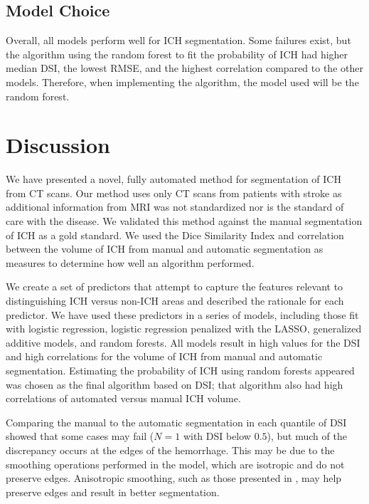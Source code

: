 \documentclass{elsarticle_nonatbib}\usepackage[]{graphicx}\usepackage[]{color}
\begin{document}
\subsection{Model Choice}
Overall, all models perform well for ICH segmentation.  Some failures exist, but the algorithm using the random forest to fit the probability of ICH had higher median DSI, the lowest RMSE, and the highest correlation compared to the other models.  Therefore, when implementing the algorithm, the model used will be the random forest.



\section{Discussion}
We have presented a novel, fully automated method for segmentation of ICH from CT scans. Our method uses only CT scans from patients with stroke as additional information from MRI was not standardized nor is the standard of care with the disease. We validated this method against the manual segmentation of ICH as a gold standard.  We used the Dice Similarity Index and correlation between the volume of ICH from manual and automatic segmentation as measures to determine how well an algorithm performed.  

We create a set of predictors that attempt to capture the features relevant to distinguishing ICH versus non-ICH areas and described the rationale for each predictor.  We have used these predictors in a series of models, including those fit with logistic regression, logistic regression penalized with the LASSO, generalized additive models, and random forests.  All models result in high values for the DSI and high correlations for the volume of ICH from manual and automatic segmentation. Estimating the probability of ICH using random forests appeared was chosen as the final algorithm based on DSI; that algorithm also had high correlations of automated versus manual ICH volume.  

Comparing the manual to the automatic segmentation in each quantile of DSI showed that some cases may fail ($N = 1$ with DSI below $0.5$), but much of the discrepancy occurs at the edges of the hemorrhage.  This may be due to the smoothing operations performed in the model, which are isotropic and do not preserve edges.  Anisotropic smoothing, such as those presented in \citet{perona1994anisotropic}, may help preserve edges and result in better segmentation.  
\end{document}
